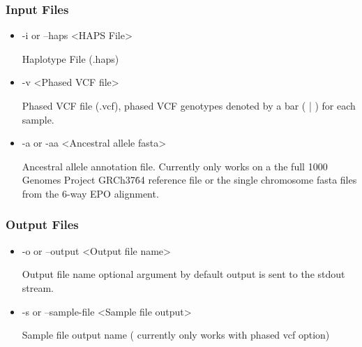 \documentclass[a4paper,10pt]{article}
\begin{document}
\subsubsection{Input Files}
\begin{itemize}
\item -i or --haps <HAPS File>

Haplotype File (.haps)

\item -v <Phased VCF file>

Phased VCF file (.vcf), phased VCF genotypes denoted by a bar ( | ) for each sample.
\item -a or -aa <Ancestral allele fasta>

Ancestral allele annotation file. Currently only works on a the full
1000 Genomes Project GRCh37\.64 reference file or the single chromosome fasta
files from the 6-way EPO alignment.

\end{itemize}
\subsubsection{Output Files}
\begin{itemize}
\item -o or --output <Output file name>

Output file name optional argument by default output is sent to the stdout stream.

\item -s or --sample-file <Sample file output>

Sample file output name ( currently only works with phased vcf option)
\end{itemize}
\end{document}
